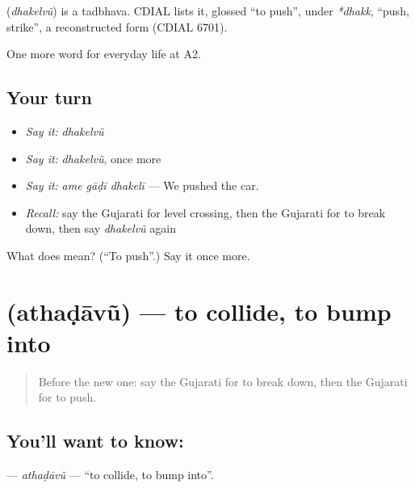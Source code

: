 \begin{cousinweb}
\textbf{} (\emph{dhakelvũ}) is a tadbhava. CDIAL lists it, glossed \textquotedblleft{}to push\textquotedblright{}, under \emph{*dhakk}, \textquotedblleft{}push, strike\textquotedblright{}, a reconstructed form (CDIAL 6701).
\end{cousinweb}

\begin{grammarlens}[title={What you've built}]
One more word for everyday life at A2.
\end{grammarlens}

\subsection*{Your turn}
\begin{itemize}
\raggedright
  \item \emph{Say it:} \emph{dhakelvũ}
  \item \emph{Say it:} \emph{dhakelvũ}, once more
  \item \emph{Say it:} \emph{ame gāḍī dhakelī} — We pushed the car.
  \item \emph{Recall:} say the Gujarati for level crossing, then the Gujarati for to break down, then say \emph{dhakelvũ} again
\end{itemize}

\begin{tcolorbox}[breakable,colback=teal!4,colframe=teal!35!black,title={Before you move on}]
What does  mean? (\textquotedblleft{}To push\textquotedblright{}.) Say it once more.
\end{tcolorbox}
\section[\texorpdfstring{\gu{અથડાવું} (athaḍāvũ)}{અથડાવું (athaḍāvũ)}]{ (athaḍāvũ) — to collide, to bump into}

\label{lesson:GU-C209-athadavu}



\begin{quote}
Before the new one: say the Gujarati for to break down, then the Gujarati for to push.
\end{quote}

\subsection*{You'll want to know: }
\textbf{} — \emph{athaḍāvũ} — \textquotedblleft{}to collide, to bump into\textquotedblright{}.

